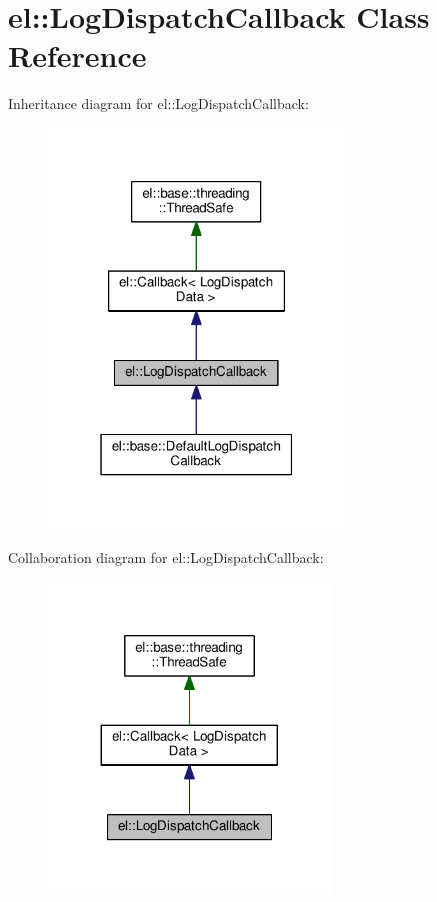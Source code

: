 \hypertarget{classel_1_1_log_dispatch_callback}{}\section{el\+:\+:Log\+Dispatch\+Callback Class Reference}
\label{classel_1_1_log_dispatch_callback}


Inheritance diagram for el\+:\+:Log\+Dispatch\+Callback\+:
\nopagebreak
\begin{figure}[H]
\begin{center}
\leavevmode
\includegraphics[width=223pt]{classel_1_1_log_dispatch_callback__inherit__graph}
\end{center}
\end{figure}


Collaboration diagram for el\+:\+:Log\+Dispatch\+Callback\+:
\nopagebreak
\begin{figure}[H]
\begin{center}
\leavevmode
\includegraphics[width=212pt]{classel_1_1_log_dispatch_callback__coll__graph}
\end{center}
\end{figure}
